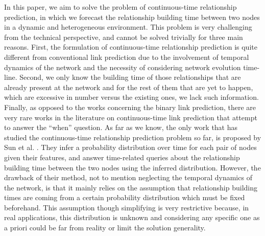 In this paper, we aim to solve the problem of continuous-time relationship prediction, in which we forecast the relationship building time between two nodes in a dynamic and heterogeneous environment. This problem is very challenging from the technical perspective, and cannot be solved trivially for three main reasons. First, the formulation of continuous-time relationship prediction is quite different from conventional link prediction due to the involvement of temporal dynamics of the network and the necessity of considering network evolution time-line. Second, we only know the building time of those relationships that are already present at the network and for the rest of them that are yet to happen, which are excessive in number versus the existing ones, we lack such information. Finally, as opposed to the works concerning the binary link prediction, there are very rare works in the literature on continuous-time link prediction that attempt to answer the ``when'' question. As far as we know, the only work that has studied the continuous-time relationship prediction problem so far, is proposed by Sun et al. \cite{sun2012will}. They infer a probability distribution over time for each pair of nodes given their features, and answer time-related queries about the relationship building time between the two nodes using the inferred distribution. However, the drawback of their method, not to mention neglecting the temporal dynamics of the network, is that it mainly relies on the assumption that relationship building times are coming from a certain probability distribution which must be fixed beforehand. This assumption though simplifying is very restrictive because, in real applications, this distribution is unknown and considering any specific one as a priori could be far from reality or limit the solution generality.

